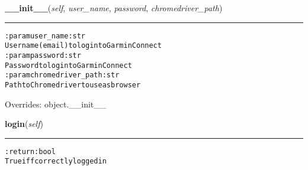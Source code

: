     \vspace{0.5ex}

\hspace{.8\funcindent}\begin{boxedminipage}{\funcwidth}

    \raggedright \textbf{\_\_init\_\_}(\textit{self}, \textit{user\_name}, \textit{password}, \textit{chromedriver\_path})

    \vspace{-1.5ex}

    \rule{\textwidth}{0.5\fboxrule}
\setlength{\parskip}{2ex}
\begin{alltt}

:param user\_name: str
    Username (email) to login to Garmin Connect
:param password: str
    Password to login to Garmin Connect
:param chromedriver\_path: str
    Path to Chrome driver to use as browser
\end{alltt}

\setlength{\parskip}{1ex}
      Overrides: object.\_\_init\_\_

    \end{boxedminipage}

    \label{pygce:models:bot:GarminConnectBot:login}

    \vspace{0.5ex}

\hspace{.8\funcindent}\begin{boxedminipage}{\funcwidth}

    \raggedright \textbf{login}(\textit{self})

    \vspace{-1.5ex}

    \rule{\textwidth}{0.5\fboxrule}
\setlength{\parskip}{2ex}
\begin{alltt}

:return: bool
    True iff correctly logged in
\end{alltt}

\setlength{\parskip}{1ex}
    \end{boxedminipage}

    \label{pygce:models:bot:GarminConnectBot:get_user_id}

